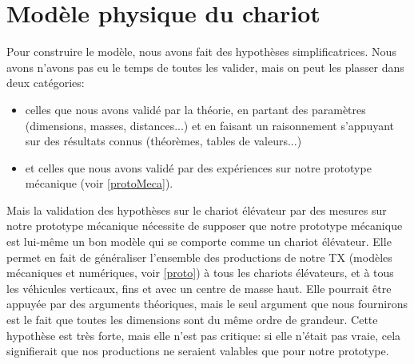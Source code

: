 \section{Modèle physique du chariot}
\label{meca}
Pour construire le modèle, nous avons fait des hypothèses simplificatrices. Nous avons n'avons pas eu le temps de toutes les valider, mais on peut les plasser dans deux catégories:
\begin{itemize}
	\item celles que nous avons validé par la théorie, en partant des paramètres (dimensions, masses, distances...) et en faisant un raisonnement s'appuyant sur des résultats connus (théorèmes, tables de valeurs...)
	\item et celles que nous avons validé par des expériences sur notre prototype mécanique (voir \ref{protoMeca}).
\end{itemize}
\label{hypProtoCommeChariot}
Mais la validation des hypothèses sur le chariot élévateur par des mesures sur notre prototype mécanique nécessite de supposer que notre prototype mécanique est lui-même un bon modèle qui se comporte comme un chariot élévateur. Elle permet en fait de généraliser l'ensemble des productions de notre TX (modèles mécaniques et numériques, voir \ref{proto}) à tous les chariots élévateurs, et à tous les véhicules verticaux, fins et avec un centre de masse haut. Elle pourrait être appuyée par des arguments théoriques, mais le seul argument que nous fournirons est le fait que toutes les dimensions sont du même ordre de grandeur. Cette hypothèse est très forte, mais elle n'est pas critique: si elle n'était pas vraie, cela signifierait que nos productions ne seraient valables que pour notre prototype.
